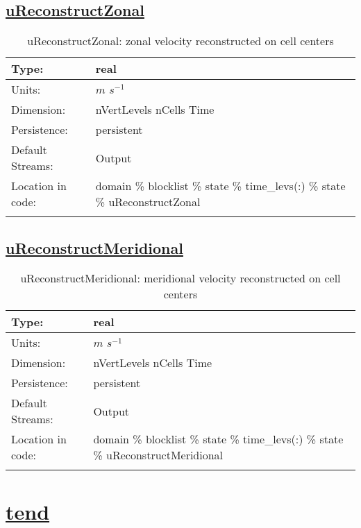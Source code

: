 \subsection[uReconstructZonal]{\hyperref[sec:var_tab_state]{uReconstructZonal}}
\label{subsec:var_sec_state_uReconstructZonal}
\begin{center}
\begin{longtable}{| p{2.0in} | p{4.0in} |}
        \hline 
        Type: & real \\
        \hline 
        Units: & $m$ $s^{-1}$ \\
        \hline 
        Dimension: & nVertLevels nCells Time \\
        \hline 
        Persistence: & persistent \\
        \hline 
		 Default Streams: & Output  \\
        \hline 
		 Location in code: & domain \% blocklist \% state \% time\_levs(:) \% state \% uReconstructZonal \\
		 \hline 
    \caption{uReconstructZonal: zonal velocity reconstructed on cell centers}
\end{longtable}
\end{center}
\subsection[uReconstructMeridional]{\hyperref[sec:var_tab_state]{uReconstructMeridional}}
\label{subsec:var_sec_state_uReconstructMeridional}
\begin{center}
\begin{longtable}{| p{2.0in} | p{4.0in} |}
        \hline 
        Type: & real \\
        \hline 
        Units: & $m$ $s^{-1}$ \\
        \hline 
        Dimension: & nVertLevels nCells Time \\
        \hline 
        Persistence: & persistent \\
        \hline 
		 Default Streams: & Output  \\
        \hline 
		 Location in code: & domain \% blocklist \% state \% time\_levs(:) \% state \% uReconstructMeridional \\
		 \hline 
    \caption{uReconstructMeridional: meridional velocity reconstructed on cell centers}
\end{longtable}
\end{center}
\section[tend]{\hyperref[sec:var_tab_tend]{tend}}
\label{sec:var_sec_tend}
